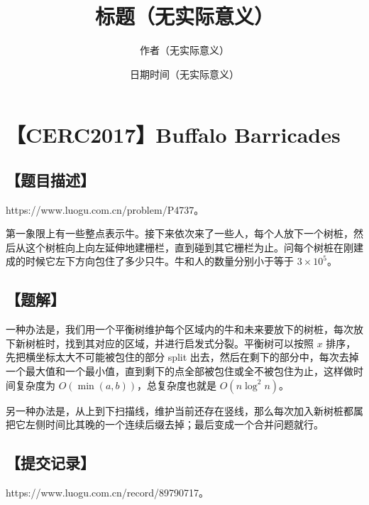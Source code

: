 \documentclass[UTF8,12pt,a4paper]{ctexart}
\title{标题（无实际意义）}
\author{作者（无实际意义）}
\date{日期时间（无实际意义）}
\begin{document}
	\fontsize{12pt}{12pt}\selectfont
	
	\newpage
	\pagestyle{fancy}
	
	
	
	\section*{【CERC2017】Buffalo Barricades}
	
	\subsection*{【题目描述】}
	
	https://www.luogu.com.cn/problem/P4737。
	
	第一象限上有一些整点表示牛。接下来依次来了一些人，每个人放下一个树桩，然后从这个树桩向上向左延伸地建栅栏，直到碰到其它栅栏为止。问每个树桩在刚建成的时候它左下方向包住了多少只牛。牛和人的数量分别小于等于 $3\times 10^5$。
	
	\subsection*{【题解】}
	
	一种办法是，我们用一个平衡树维护每个区域内的牛和未来要放下的树桩，每次放下新树桩时，找到其对应的区域，并进行启发式分裂。平衡树可以按照 $x$ 排序，先把横坐标太大不可能被包住的部分 split 出去，然后在剩下的部分中，每次去掉一个最大值和一个最小值，直到剩下的点全部被包住或全不被包住为止，这样做时间复杂度为 $O(\min(a,b))$，总复杂度也就是 $O(n\log^2 n)$。
	
	另一种办法是，从上到下扫描线，维护当前还存在竖线，那么每次加入新树桩都属把它左侧时间比其晚的一个连续后缀去掉；最后变成一个合并问题就行。
	
	\subsection*{【提交记录】}
	
	https://www.luogu.com.cn/record/89790717。
	
	
\end{document}
